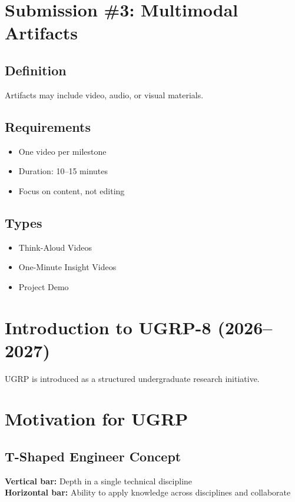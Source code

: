 \documentclass[12pt]{article}
\begin{document}
\section{Submission \#3: Multimodal Artifacts}

\subsection{Definition}
Artifacts may include video, audio, or visual materials.

\subsection{Requirements}
\begin{itemize}
    \item One video per milestone
    \item Duration: 10--15 minutes
    \item Focus on content, not editing
\end{itemize}

\subsection{Types}
\begin{itemize}
    \item Think-Aloud Videos
    \item One-Minute Insight Videos
    \item Project Demo
\end{itemize}

\section{Introduction to UGRP-8 (2026--2027)}

UGRP is introduced as a structured undergraduate research initiative.

\section{Motivation for UGRP}

\subsection{T-Shaped Engineer Concept}
\textbf{Vertical bar:} Depth in a single technical discipline\\
\textbf{Horizontal bar:} Ability to apply knowledge across disciplines and collaborate
\end{document}
